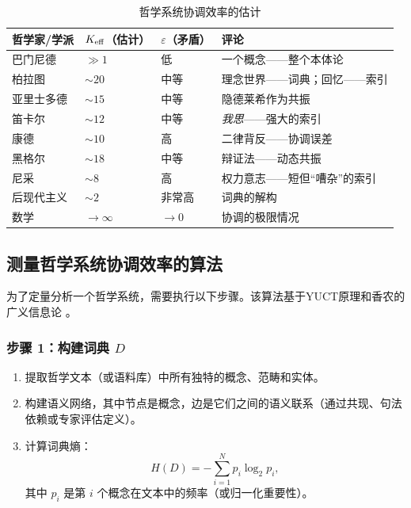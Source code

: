 \documentclass[11pt,a4paper]{article}
\newcommand{\eps}{\varepsilon}
\begin{document}
	\begin{table}[H]
		\centering
		\caption{哲学系统协调效率的估计}
		\label{tab:keff-examples}
		\begin{tabular}{p{3.5cm}p{3.5cm}p{3.5cm}p{3.5cm}}
			\toprule
			\textbf{哲学家/学派} & \(\Keff\)（估计） & \(\eps\)（矛盾） & \textbf{评论} \\
			\midrule
			巴门尼德 & \(\gg 1\) & 低 & 一个概念——整个本体论 \\
			柏拉图 & \(\sim 20\) & 中等 & 理念世界——词典；回忆——索引 \\
			亚里士多德 & \(\sim 15\) & 中等 & 隐德莱希作为共振 \\
			笛卡尔 & \(\sim 12\) & 中等 & \textit{我思}——强大的索引 \\
			康德 & \(\sim 10\) & 高 & 二律背反——协调误差 \\
			黑格尔 & \(\sim 18\) & 中等 & 辩证法——动态共振 \\
			尼采 & \(\sim 8\) & 高 & 权力意志——短但“嘈杂”的索引 \\
			后现代主义 & \(\sim 2\) & 非常高 & 词典的解构 \\
			数学 & \(\to \infty\) & \(\to 0\) & 协调的极限情况 \\
			\bottomrule
		\end{tabular}
	\end{table}
	
	\subsection{测量哲学系统协调效率的算法}
	\label{subsec:measurement-algorithm}
	
	为了定量分析一个哲学系统，需要执行以下步骤。该算法基于YUCT原理和香农的广义信息论 \cite{AppendixX}。
	
	\subsubsection{步骤 1：构建词典 \(D\)}
	
	\begin{enumerate}
		\item 提取哲学文本（或语料库）中所有独特的概念、范畴和实体。
		\item 构建语义网络，其中节点是概念，边是它们之间的语义联系（通过共现、句法依赖或专家评估定义）。
		\item 计算词典熵：
		\[
		H(D) = -\sum_{i=1}^{N} p_i \log_2 p_i,
		\]
		其中 \(p_i\) 是第 \(i\) 个概念在文本中的频率（或归一化重要性）。
	\end{enumerate}
	
\end{document}
